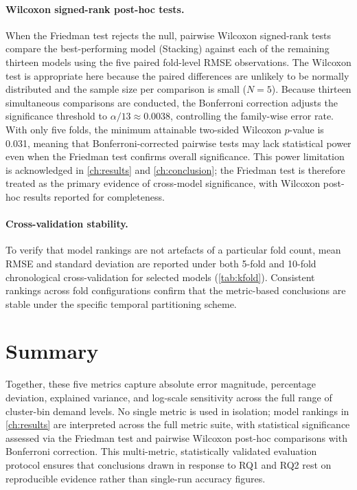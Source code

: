 \paragraph{Wilcoxon signed-rank post-hoc tests.} When the Friedman test rejects the null, pairwise Wilcoxon signed-rank tests compare the best-performing model (Stacking) against each of the remaining thirteen models using the five paired fold-level RMSE observations. The Wilcoxon test is appropriate here because the paired differences are unlikely to be normally distributed and the sample size per comparison is small ($N{=}5$). Because thirteen simultaneous comparisons are conducted, the Bonferroni correction adjusts the significance threshold to $\alpha / 13 \approx 0.0038$, controlling the family-wise error rate. With only five folds, the minimum attainable two-sided Wilcoxon $p$-value is 0.031, meaning that Bonferroni-corrected pairwise tests may lack statistical power even when the Friedman test confirms overall significance. This power limitation is acknowledged in \autoref{ch:results} and \autoref{ch:conclusion}; the Friedman test is therefore treated as the primary evidence of cross-model significance, with Wilcoxon post-hoc results reported for completeness.

\paragraph{Cross-validation stability.} To verify that model rankings are not artefacts of a particular fold count, mean RMSE and standard deviation are reported under both 5-fold and 10-fold chronological cross-validation for selected models (\autoref{tab:kfold}). Consistent rankings across fold configurations confirm that the metric-based conclusions are stable under the specific temporal partitioning scheme.

\section{Summary}

Together, these five metrics capture absolute error magnitude, percentage deviation, explained variance, and log-scale sensitivity across the full range of cluster-bin demand levels. No single metric is used in isolation; model rankings in \autoref{ch:results} are interpreted across the full metric suite, with statistical significance assessed via the Friedman test and pairwise Wilcoxon post-hoc comparisons with Bonferroni correction. This multi-metric, statistically validated evaluation protocol ensures that conclusions drawn in response to RQ1 and RQ2 rest on reproducible evidence rather than single-run accuracy figures.
